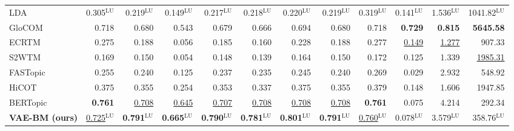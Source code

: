 \begin{table}[htb]
{\begin{tabular}{lrrrrrrrrrrr}
LDA & 0.305$^{\mathrm{LU}}$ & 0.219$^{\mathrm{LU}}$ & 0.149$^{\mathrm{LU}}$ & 0.217$^{\mathrm{LU}}$ & 0.218$^{\mathrm{LU}}$ & 0.220$^{\mathrm{LU}}$ & 0.219$^{\mathrm{LU}}$ & 0.319$^{\mathrm{LU}}$ & 0.141$^{\mathrm{LU}}$ & 1.536$^{\mathrm{LU}}$ & 1041.82$^{\mathrm{LU}}$ \\
GloCOM & 0.718 & 0.680 & 0.543 & 0.679 & 0.666 & 0.694 & 0.680 & 0.718 & \textbf{0.729} & \textbf{0.815} & \textbf{5645.58} \\
ECRTM & 0.275 & 0.188 & 0.056 & 0.185 & 0.160 & 0.228 & 0.188 & 0.277 & \underline{0.149} & \underline{1.277} & 907.33 \\
S2WTM & 0.169 & 0.150 & 0.054 & 0.148 & 0.139 & 0.164 & 0.150 & 0.172 & 0.125 & 1.339 & \underline{1985.31} \\
FASTopic & 0.255 & 0.240 & 0.125 & 0.237 & 0.235 & 0.245 & 0.240 & 0.269 & 0.029 & 2.932 & 548.92 \\
HiCOT & 0.375 & 0.355 & 0.254 & 0.353 & 0.337 & 0.375 & 0.355 & 0.379 & 0.148 & 1.606 & 1947.85 \\
BERTopic & \textbf{0.761} & \underline{0.708} & \underline{0.645} & \underline{0.707} & \underline{0.708} & \underline{0.708} & \underline{0.708} & \textbf{0.761} & 0.075 & 4.214 & 292.34 \\
\midrule
\textbf{VAE-BM (ours)} & \underline{0.725}$^{\mathrm{LU}}$ & \textbf{0.791}$^{\mathrm{LU}}$ & \textbf{0.665}$^{\mathrm{LU}}$ & \textbf{0.790}$^{\mathrm{LU}}$ & \textbf{0.781}$^{\mathrm{LU}}$ & \textbf{0.801}$^{\mathrm{LU}}$ & \textbf{0.791}$^{\mathrm{LU}}$ & \underline{0.760}$^{\mathrm{LU}}$ & 0.078$^{\mathrm{LU}}$ & 3.579$^{\mathrm{LU}}$ & 358.76$^{\mathrm{LU}}$ \\
\bottomrule
\end{tabular}
}
\end{table}
